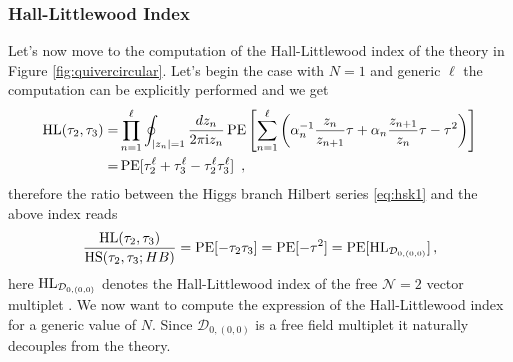 \documentclass[main.tex]{subfiles}
\begin{document}
\subsubsection{Hall-Littlewood Index}
Let's now move to the computation of the Hall-Littlewood index of the theory in Figure \ref{fig:quivercircular}. Let's begin the case with $N=1$ and generic $\ell$ the computation can be explicitly performed and we get
\begin{equation}
\label{eq:HL}
\begin{aligned}
\textrm{HL}(\tau_2,\tau_3) =&\prod_{n=1}^{\ell}\oint_{\mid z_n \mid =1 }\frac{dz_n}{2\pi\mathrm{i} z_n}\operatorname{\mathrm{PE}}\left[\sum_{n=1}^{\ell}\left(\alpha_n^{-1}\frac{z_n}{z_{n+1}}\tau+\alpha_n\frac{z_{n+1}}{z_{n}}\tau-\tau^2\right)\right]\\
=&\operatorname{\mathrm{PE}}[\tau_2^{\ell}+\tau_3^{\ell}-\tau_2^{\ell}\tau_3^{\ell}] \, \ ,
\end{aligned}
\end{equation}
therefore the ratio between the Higgs branch Hilbert series \eqref{eq:hsk1} and the above index reads
\begin{equation}
\frac{\textrm{HL}(\tau_2,\tau_3) }{\textrm{HS}(\tau_2,\tau_3;HB)}= \operatorname{\mathrm{PE}}[-\tau_2\tau_3]=\operatorname{\mathrm{PE}}[-\tau^2] = \operatorname{\mathrm{PE}}[\textrm{HL}_{\mathcal{D}_{0,(0,0)}}] \, ,
\end{equation}
here $\textrm{HL}_{\mathcal{D}_{0,(0,0)}}$ denotes the Hall-Littlewood index of the free $\mathcal{N}=2$ vector multiplet \cite{Gadde:2011uv,Dolan:2002zh}.
We now want to compute the expression of the Hall-Littlewood index for a generic value of $N$. Since $\mathcal{D}_{0,(0,0)}$ is a free field multiplet it naturally decouples from the theory. 
\end{document}

